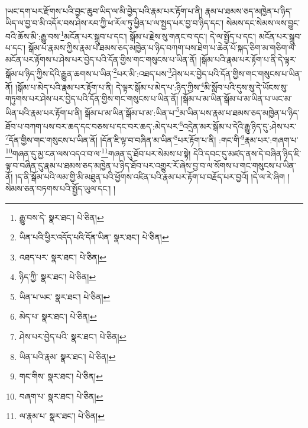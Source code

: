 །ཡང་དག་པར་རྫོགས་པའི་བྱང་ཆུབ་ཡིད་ལ་མི་བྱེད་པའི་རྣམ་པར་རྟོག་པ་ནི། རྣམ་པ་ཐམས་ཅད་མཁྱེན་པ་ཉིད་ཡིད་ལ་བྱ་བ་མི་འདོར་བས་ཤེས་རབ་ཀྱི་ཕ་རོལ་ཏུ་ཕྱིན་པ་ལ་སྤྱད་པར་བྱ་བ་ཉིད་དང་། སེམས་དང་སེམས་ལས་བྱུང་བའི་ཆོས་མི་:རྒྱུ་བས་\footnote{རྒྱུ་བས་དེ་  སྣར་ཐང་།  པེ་ཅིན། }མངོན་པར་སྒྲུབ་པ་དང་། སྒོམ་པ་རྗེས་སུ་གནང་བ་དང་། དེ་ལ་སྤྱོད་པ་དང་། མངོན་པར་སྒྲུབ་པ་དང་། སྒོམ་པ་རྣམས་ཀྱིས་རྣམ་པ་ཐམས་ཅད་མཁྱེན་པ་ཉིད་བཀག་པས་ཐེག་པ་ཆེན་པོ་སྐད་ཅིག་མ་གཅིག་ལ་མངོན་པར་རྟོགས་པ་ཤེས་པར་བྱེད་པའི་དོན་གྱིས་གང་གསུངས་པ་ཡིན་ནོ། །སྒོམ་པའི་རྣམ་པར་རྟོག་པ་ནི་དེ་ལྟར་སྒོམ་པ་ཉིད་ཀྱིས་དེའི་རྒྱུན་ཆགས་པ་ཡིན་\footnote{ཡིན་པའི་ཕྱིར་འདོད་པའི་དོན་ཡིན་  སྣར་ཐང་།  པེ་ཅིན། }པར་མི་:འཐད་པས་\footnote{འཐད་པར་  སྣར་ཐང་།  པེ་ཅིན། }ཤེས་པར་བྱེད་པའི་དོན་གྱིས་གང་གསུངས་པ་ཡིན་ནོ། །སྒོམ་པ་མེད་པའི་རྣམ་པར་རྟོག་པ་ནི། དེ་ལྟར་སྒོམ་པ་མེད་པ་:ཉིད་ཀྱིས་\footnote{ཉིད་ཀྱི་  སྣར་ཐང་།  པེ་ཅིན། }མི་སློབ་པའི་དུས་སུ་དེ་ཡོངས་སུ་གཏུགས་པར་ཤེས་པར་བྱེད་པའི་དོན་གྱིས་གང་གསུངས་པ་ཡིན་ནོ། །སྒོམ་པ་མ་ཡིན་སྒོམ་པ་མ་ཡིན་པ་ཡང་མ་ཡིན་པའི་རྣམ་པར་རྟོག་པ་ནི། སྒོམ་པ་མ་ཡིན་སྒོམ་པ་མ་:ཡིན་པ་\footnote{ཡིན་པ་ཡང་  སྣར་ཐང་།  པེ་ཅིན། }མ་ཡིན་པས་རྣམ་པ་ཐམས་ཅད་མཁྱེན་པ་ཉིད་ཐོབ་པ་བཀག་པས་བར་ཆད་དང་བཅས་པ་དང་བར་ཆད་:མེད་པར་\footnote{མེད་པ་  སྣར་ཐང་།  པེ་ཅིན། }འདྲེན་མར་སྒོམ་པ་དེའི་རྒྱུ་ཉིད་དུ་:ཤེས་པར་\footnote{ཤེས་པར་བྱེད་པའི་  སྣར་ཐང་།  པེ་ཅིན། }དོན་གྱིས་གང་གསུངས་པ་ཡིན་ནོ། །དོན་ཇི་ལྟ་བ་བཞིན་མ་ཡིན་\footnote{ཡིན་པའི་རྣམ་  སྣར་ཐང་།  པེ་ཅིན། }པར་རྟོག་པ་ནི། :གང་གི་\footnote{གང་གིས་  སྣར་ཐང་།  པེ་ཅིན། }རྣམ་པར་:གཞག་པ་\footnote{བཞག་པ་  སྣར་ཐང་།  པེ་ཅིན། }གཞན་དུ་མྱ་ངན་ལས་འདའ་བ་ལ་\footnote{ལ་རྣམ་པ་  སྣར་ཐང་།  པེ་ཅིན། }གཞན་དུ་ཐོབ་པར་སེམས་པ་སྟེ། དེའི་དབང་དུ་མཛད་ནས་དེ་བཞིན་ཉིད་ཇི་ལྟ་བ་བཞིན་དུ་རྣམ་པ་ཐམས་ཅད་མཁྱེན་པ་ཉིད་ཐོབ་པར་འགྱུར་རོ་ཞེས་བྱ་བ་ལ་སོགས་པ་གང་གསུངས་པ་ཡིན་ནོ། །ད་ནི་སྒོམ་པའི་ལམ་གྱི་མི་མཐུན་པའི་ཕྱོགས་འཛིན་པའི་རྣམ་པར་རྟོག་པ་བརྗོད་པར་བྱའོ། །དེ་ལ་རེ་ཞིག །སེམས་ཅན་བཏགས་པའི་སྤྱོད་ཡུལ་དང་། །
